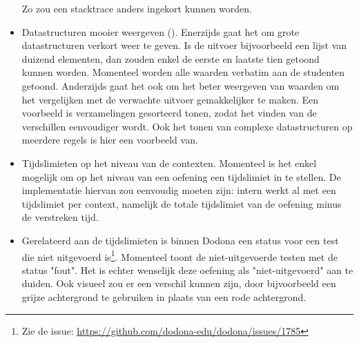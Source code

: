 \begin{itemize}
    Zo zou een stacktrace anders ingekort kunnen worden.
    \item Datastructuren mooier weergeven ().
    Enerzijds gaat het om grote datastructuren verkort weer te geven.
    Is de uitvoer bijvoorbeeld een lijst van duizend elementen, dan zouden enkel de eerste en laatste tien getoond kunnen worden.
    Momenteel worden alle waarden verbatim aan de studenten getoond.
    Anderzijds gaat het ook om het beter weergeven van waarden om het vergelijken met de verwachte uitvoer gemakkelijker te maken.
    Een voorbeeld is verzamelingen gesorteerd tonen, zodat het vinden van de verschillen eenvoudiger wordt.
    Ook het tonen van complexe datastructuren op meerdere regels is hier een voorbeeld van.
    \item Tijdslimieten op het niveau van de contexten.
    Momenteel is het enkel mogelijk om op het niveau van een oefening een tijdslimiet in te stellen.
    De implementatie hiervan zou eenvoudig moeten zijn: intern werkt \tested{} al met een tijdslimiet per context, namelijk de totale tijdslimiet van de oefening minus de verstreken tijd.
    \item Gerelateerd aan de tijdslimieten is binnen Dodona een status voor een test die niet uitgevoerd is\footnote{Zie de issue: \url{https://github.com/dodona-edu/dodona/issues/1785}}.
    Momenteel toont \tested{} de niet-uitgevoerde testen met de status "fout".
    Het is echter wenselijk deze oefening als "niet-uitgevoerd" aan te duiden.
    Ook visueel zou er een verschil kunnen zijn, door bijvoorbeeld een grijze achtergrond te gebruiken in plaats van een rode achtergrond.
\end{itemize}